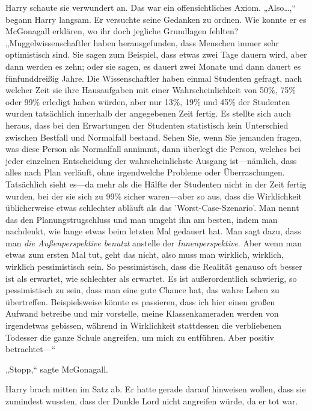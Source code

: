 Harry schaute sie verwundert an. Das war ein offensichtliches Axiom. „Also…,“ begann Harry langsam. Er versuchte seine Gedanken zu ordnen. Wie konnte er es McGonagall erklären, wo ihr doch jegliche Grundlagen fehlten? „Muggelwissenschaftler haben herausgefunden, dass Menschen immer sehr optimistisch sind. Sie sagen zum Beispiel, dass etwas zwei Tage dauern wird, aber dann werden es zehn; oder sie sagen, es dauert zwei Monate und dann dauert es fünfunddreißig Jahre. Die Wissenschaftler haben einmal Studenten gefragt, nach welcher Zeit sie ihre Hausaufgaben mit einer Wahrscheinlichkeit von 50\%, 75\% oder 99\% erledigt haben würden, aber nur 13\%, 19\% und 45\% der Studenten wurden tatsächlich innerhalb der angegebenen Zeit fertig. Es stellte sich auch heraus, dass bei den Erwartungen der Studenten statistisch kein Unterschied zwischen Bestfall und Normalfall bestand. Sehen Sie, wenn Sie jemanden fragen, was diese Person als Normalfall annimmt, dann überlegt die Person, welches bei jeder einzelnen Entscheidung der wahrscheinlichste Ausgang ist—nämlich, dass alles nach Plan verläuft, ohne irgendwelche Probleme oder Überraschungen. Tatsächlich sieht es—da mehr als die Hälfte der Studenten nicht in der Zeit fertig wurden, bei der sie sich zu 99\% sicher waren—aber so aus, dass die Wirklichkeit üblicherweise etwas schlechter abläuft als das 'Worst-Case-Szenario'. Man nennt das den Planungstrugschluss und man umgeht ihn am besten, indem man nachdenkt, wie lange etwas beim letzten Mal gedauert hat. Man sagt dazu, dass man \emph{die Außenperspektive benutzt} anstelle der \emph{Innenperspektive}. Aber wenn man etwas zum ersten Mal tut, geht das nicht, also muss man wirklich, wirklich, wirklich pessimistisch sein. So pessimistisch, dass die Realität genauso oft besser ist als erwartet, wie schlechter als erwartet. Es ist außerordentlich schwierig, so pessimistisch zu sein, dass man eine gute Chance hat, das wahre Leben zu übertreffen. Beispielsweise könnte es passieren, dass ich hier einen großen Aufwand betreibe und mir vorstelle, meine Klassenkameraden werden von irgendetwas gebissen, während in Wirklichkeit stattdessen die verbliebenen Todesser die ganze Schule angreifen, um mich zu entführen. Aber positiv betrachtet—“

„Stopp,“ sagte McGonagall.

Harry brach mitten im Satz ab. Er hatte gerade darauf hinweisen wollen, dass sie zumindest wussten, dass der Dunkle Lord nicht angreifen würde, da er tot war.

